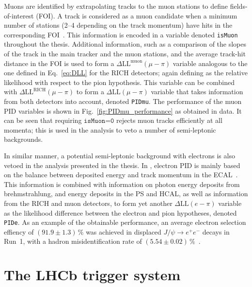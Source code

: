 Muons are identified by extrapolating tracks to the muon stations to define fields-of-interest (FOI). A track is considered as a muon candidate when a minimum number of stations (2--4 depending on the track momentum) have hits in the corresponding FOI~\cite{MuonPID,MuonPID2}. This information is encoded in a variable denoted \texttt{isMuon} throughout the thesis. Additional information, such as a comparison of the slopes of the track in the main tracker and the muon stations, and the average track-hit distance in the FOI is used to form a $\Delta \text{LL}^\text{muon}(\mu-\pi)$ variable analogous to the one defined in Eq.~\eqref{eq:DLL} for the RICH detectors; again defining as the relative likelihood with respect to the pion hypothesis. This variable can be combined with $\Delta \text{LL}^\text{RICH}(\mu-\pi)$ to form a $\Delta \text{LL}(\mu-\pi)$ variable that takes information from both detectors into account, denoted \texttt{PIDmu}. The performance of the muon PID variables is shown in Fig.~\ref{fig:PIDmu_performance} as obtained in data. It can be seen that requiring $\texttt{isMuon=0}$ rejects muon tracks efficiently at all momenta; this is used in the analysis to veto a number of semi-leptonic backgrounds.

In similar manner, a potential semi-leptonic background with electrons is also vetoed in the analysis presented in the thesis. In \lhcb, electron PID is mainly based on the balance between deposited energy and track momentum in the ECAL~\cite{ElectronPID}. This information is combined with information on photon energy deposits from brehmstrahlung, and energy deposits in the PS and HCAL, as well as information from the RICH and muon detectors, to form yet another $\Delta\text{LL}(e-\pi)$ variable as the likelihood difference between the electron and pion hypotheses, denoted \texttt{PIDe}. As an example of the obtainable performance, an average electron selection effiency of $(91.9\pm1.3)$\,\% was achieved in displaced $J/\psi\to e^+e^-$ decays in Run~1, with a hadron misidentification rate of $(5.54\pm0.02)$\,\%~\cite{LHCb-Performance}.



\section{The LHCb trigger system} %
\label{sec:the_lhcb_triggerring_system}

